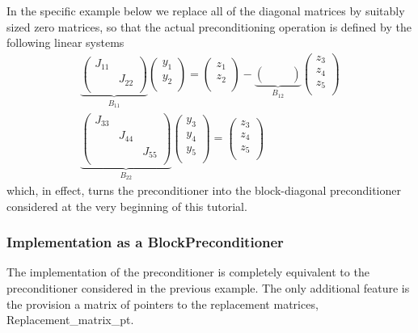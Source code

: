 In the specific example below we replace all of the diagonal matrices by suitably sized zero matrices, so that the actual preconditioning operation is defined by the following linear systems \[ \begin{array}{c} \underbrace{ \left( \begin{array}{cc} J_{11} & \\ & J_{22} \\ \end{array} \right) }_{B_{11}} \left( \begin{array}{c} y_1 \\ y_2 \\ \end{array} \right) = \left( \begin{array}{c} z_1 \\ z_2 \\ \end{array} \right) - \underbrace{ \left( \begin{array}{ccc} & & \\ & & \\ \end{array} \right) }_{B_{12}} \left( \begin{array}{c} z_3 \\ z_4 \\ z_5 \\ \end{array} \right) \\ \underbrace{ \left( \begin{array}{ccc} J_{33} & & \\ & J_{44} & \\ & & J_{55} \\ \end{array} \right) }_{B_{22}} \left( \begin{array}{c} y_3 \\ y_4 \\ y_5 \\ \end{array} \right) = \left( \begin{array}{c} z_3 \\ z_4 \\ z_5 \\ \end{array} \right) \end{array} \] which, in effect, turns the preconditioner into the block-\/diagonal preconditioner considered at the very beginning of this tutorial.\hypertarget{index_two_plus_three_upper_triangular_with_replace_implementation}{}\subsubsection{Implementation as a Block\+Preconditioner}\label{index_two_plus_three_upper_triangular_with_replace_implementation}
The implementation of the preconditioner is completely equivalent to the preconditioner considered in the previous example. The only additional feature is the provision a matrix of pointers to the replacement matrices, {\ttfamily Replacement\+\_\+matrix\+\_\+pt}.


